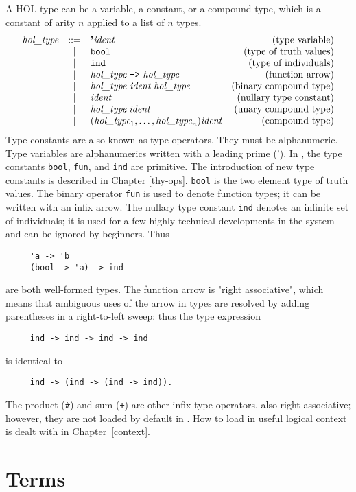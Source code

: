 {A HOL type can be a variable, a constant, or a compound type, which is
a constant of arity $n$ applied to a list of $n$ types.
\[
\begin{array}{rclr}
  \type & ::= & \mbox{\bf '}\ident & \mbox{(type variable)} \\
  & | &  \verb+bool+ & \mbox{(type of truth values)} \\
  & | &  \verb+ind+ & \mbox{(type of individuals)} \\
  & | &  \type\ \verb+->+\ \type & \mbox{(function arrow)} \\
  & | &  \type\ \ident\ \type\ & \mbox{(binary compound type)}\\
  & | &  \ident & \mbox{(nullary type constant)} \\
  & | & \type\; \ident & \mbox{(unary compound type)} \\
  & | & (\type_1,\ldots,\type_n) \ident & \mbox{(compound type)}
\end{array}
\]
Type constants are also known as type operators. They must be
alphanumeric. Type variables are alphanumerics written with a leading
prime ('). In \holn{}, the type constants {\tt bool}, {\tt fun}, and
{\tt ind} are primitive. The introduction of new type constants is
described in Chapter \ref{thy-ops}. {\tt bool} is the two element type
of truth values. The binary operator {\tt fun} is used to denote
function types; it can be written with an infix arrow. The nullary
type constant {\tt ind} denotes an infinite set of individuals; it is
used for a few highly technical developments in the system and can be
ignored by beginners.  Thus
\begin{verbatim}
     'a -> 'b
     (bool -> 'a) -> ind
\end{verbatim}
are both well-formed types. The function arrow is "right associative",
which means that ambiguous uses of the arrow in types are resolved by
adding parentheses in a right-to-left sweep: thus the type expression
\begin{verbatim}
     ind -> ind -> ind -> ind
\end{verbatim}
is identical to
\begin{verbatim}
     ind -> (ind -> (ind -> ind)).
\end{verbatim}
The product (\verb+#+) and sum (\verb!+!) are other infix type
operators, also right associative; however, they are not loaded by
default in \holn{}. How to load in useful logical context is dealt with
in Chapter~\ref{context}.

\section{Terms}

}
